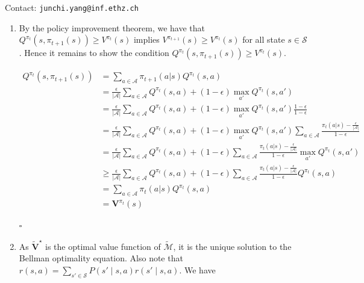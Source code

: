 Contact: \texttt{junchi.yang@inf.ethz.ch}


\begin{Solution}
    \begin{enumerate} [label=\alph*)]
        \item
        By the policy improvement theorem, we have that $Q^{\pi_t}(s, \pi_{t+1}(s)) \geq V^{\pi_t}(s)$ implies $V^{\pi_{t+1}}(s) \geq V^{\pi_t}(s)$ for all state $s \in \mathcal{S}$. Hence it remains to show the condition $Q^{\pi_t}(s, \pi_{t+1}(s)) \geq V^{\pi_t}(s)$.

        $$
        \begin{aligned}
        Q^{\pi_t}(s,\pi_{t+1}(s)) & = \sum_{a \in \mathcal{A}}\pi_{t+1}(a|s)Q^{\pi_t}(s,a) \\
        & = \frac{\epsilon}{|\mathcal{A}|} \sum_{a \in \mathcal{A}}Q^{\pi_t}(s,a) + (1-\epsilon)\mathop{\max}_{a'}Q^{\pi_t}(s,a') \\
        & = \frac{\epsilon}{|\mathcal{A}|} \sum_{a \in \mathcal{A}}Q^{\pi_t}(s,a) + (1-\epsilon)\mathop{\max}_{a'}Q^{\pi_t}(s,a') \frac{1-\epsilon}{1-\epsilon} \\
        & = \frac{\epsilon}{|\mathcal{A}|} \sum_{a \in \mathcal{A}}Q^{\pi_t}(s,a) + (1-\epsilon)\mathop{\max}_ {a'}Q^{\pi_t}(s,a') \sum_{a \in \mathcal{A}}\frac{\pi_t(a|s)-\frac{\epsilon}{|\mathcal{A}|}}{1-\epsilon} \\
        & = \frac{\epsilon}{|\mathcal{A}|} \sum_{a \in \mathcal{A}}Q^{\pi_t}(s,a) + (1-\epsilon)\sum_{a \in \mathcal{A}} \frac{\pi_t(a|s)-\frac{\epsilon}{|\mathcal{A}|}}{1-\epsilon} \mathop{\max}_{a'}Q^{\pi_t}(s,a') \\
        & \geq \frac{\epsilon}{|\mathcal{A}|} \sum_{a \in \mathcal{A}}Q^{\pi_t}(s,a) + (1-\epsilon)\sum_{a \in \mathcal{A}} \frac{\pi_t(a|s)-\frac{\epsilon}{|\mathcal{A}|}}{1-\epsilon} Q^{\pi_t}(s,a) \\
        & = \sum_{a \in \mathcal{A}}\pi_t(a|s)Q^{\pi_t}(s,a) \\
        & = \boldsymbol{V}^{\pi_t}(s)
        \end{aligned}
        $$ \begin{flushright} $\square$ \end{flushright}
        \item
        As $\boldsymbol{\widetilde{V}}^\star$ is the optimal value function of $\widetilde{\mathcal{M}}$, it is the unique solution to the Bellman optimality equation. Also note that $r(s,a) = \sum_{s'\in \mathcal{S}} P(s' \mid s, a) r(s' \mid s, a)$. We have
        $$
        \begin{aligned}

\end{aligned}$$
\end{enumerate}
\end{Solution}
